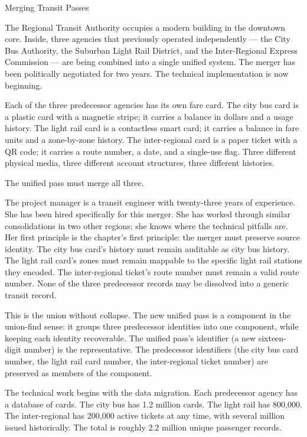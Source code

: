 \begin{coda}{Merging Transit Passes}

The Regional Transit Authority occupies a modern building in the
downtown core. Inside, three agencies that previously operated
independently --- the City Bus Authority, the Suburban Light Rail
District, and the Inter-Regional Express Commission --- are being
combined into a single unified system. The merger has been politically
negotiated for two years. The technical implementation is now
beginning.

Each of the three predecessor agencies has its own fare card. The
city bus card is a plastic card with a magnetic stripe; it carries a
balance in dollars and a usage history. The light rail card is a
contactless smart card; it carries a balance in fare units and a
zone-by-zone history. The inter-regional card is a paper ticket
with a QR code; it carries a route number, a date, and a single-use
flag. Three different physical media, three different account
structures, three different histories.

The unified pass must merge all three.

The project manager is a transit engineer with twenty-three years of
experience. She has been hired specifically for this merger. She has
worked through similar consolidations in two other regions; she
knows where the technical pitfalls are. Her first principle is the
chapter's first principle: the merger must preserve source identity.
The city bus card's history must remain auditable as city bus
history. The light rail card's zones must remain mappable to the
specific light rail stations they encoded. The inter-regional
ticket's route number must remain a valid route number. None of the
three predecessor records may be dissolved into a generic transit
record.

This is the union without collapse. The new unified pass is a
component in the union-find sense: it groups three predecessor
identities into one component, while keeping each identity recoverable.
The unified pass's identifier (a new sixteen-digit number) is the
representative. The predecessor identifiers (the city bus card number,
the light rail card number, the inter-regional ticket number) are
preserved as members of the component.

The technical work begins with the data migration. Each predecessor
agency has a database of cards. The city bus has 1.2 million cards.
The light rail has 800,000. The inter-regional has 200,000 active
tickets at any time, with several million issued historically. The
total is roughly 2.2 million unique passenger records.


\end{coda}
